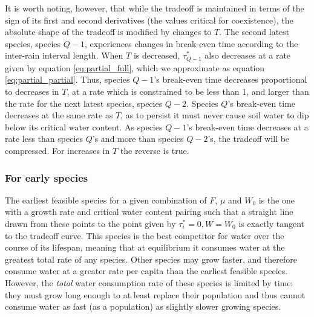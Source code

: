 \documentclass[11pt]{article}
\begin{document}
It is worth noting, however, that while the tradeoff is maintained in terms of the sign of its first and second derivatives (the values critical for coexistence), the absolute shape of the tradeoff is modified by changes to \(T\). The second latest species, species \(Q-1\), experiences changes in break-even time according to the inter-rain interval length. When \(T\) is decreased, \(\tau_{Q-1}^*\) also decreases at a rate given by equation \ref{eq:partial_full}, which we approximate as equation \ref{eq:partial_partial}. Thus, species \(Q-1\)'s break-even time decreases proportional to decreases in \(T\), at a rate which is constrained to be less than 1, and larger than the rate for the next latest species, species \(Q-2\). Species \(Q\)'s break-even time decreases at the same rate as \(T\), as to persist it must never cause soil water to dip below its critical water content. As species \(Q-1\)'s break-even time decreases at a rate less than species \(Q\)'s and more than species \(Q-2\)'s, the tradeoff will be compressed. For increases in \(T\) the reverse is true.

\subsubsection{For early species}
\label{sec:orga229d47}

The earliest feasible species for a given combination of \(F\), \(\mu\) and \(W_0\) is the one with a growth rate and critical water content pairing such that a straight line drawn from these points to the point given by \(\tau_i^* = 0, W = W_0\) is exactly tangent to the tradeoff curve. This species is the best competitor for water over the course of its lifespan, meaning that at equilibrium it consumes water at the greatest total rate of any species. Other species may grow faster, and therefore consume water at a greater rate per capita than the earliest feasible species. However, the \emph{total} water consumption rate of these species is limited by time: they must grow long enough to at least replace their population and thus cannot consume water as fast (as a population) as slightly slower growing species.
\end{document}
